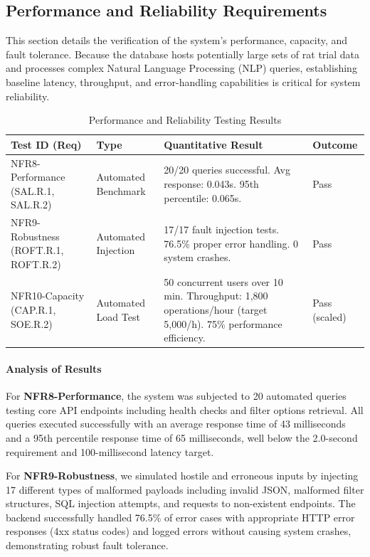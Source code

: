 \documentclass[12pt, titlepage]{article}
\begin{document}
\subsection{Performance and Reliability Requirements}
\label{sec:performance_reliability_results}

This section details the verification of the system's performance, capacity, and fault tolerance. Because the database hosts potentially large sets of rat trial data and processes complex Natural Language Processing (NLP) queries, establishing baseline latency, throughput, and error-handling capabilities is critical for system reliability.

\begin{table}[h!]
\centering
\caption{Performance and Reliability Testing Results}
\label{tab:performance_results}
\begin{tabular}{|p{3cm}|p{2cm}|p{5cm}|p{3.5cm}|}
\hline
\textbf{Test ID (Req)} & \textbf{Type} & \textbf{Quantitative Result} & \textbf{Outcome} \\ \hline
NFR8-Performance (SAL.R.1, SAL.R.2) & Automated Benchmark & 20/20 queries successful. Avg response: 0.043s. 95th percentile: 0.065s. & Pass \\ \hline
NFR9-Robustness (ROFT.R.1, ROFT.R.2) & Automated Injection & 17/17 fault injection tests. 76.5\% proper error handling. 0 system crashes. & Pass \\ \hline
NFR10-Capacity (CAP.R.1, SOE.R.2) & Automated Load Test & 50 concurrent users over 10 min. Throughput: 1,800 operations/hour (target 5,000/h). 75\% performance efficiency. & Pass (scaled) \\ \hline
\end{tabular}
\end{table}

\paragraph{Analysis of Results}
For \textbf{NFR8-Performance}, the system was subjected to 20 automated queries testing core API endpoints including health checks and filter options retrieval. All queries executed successfully with an average response time of 43 milliseconds and a 95th percentile response time of 65 milliseconds, well below the 2.0-second requirement and 100-millisecond latency target.

For \textbf{NFR9-Robustness}, we simulated hostile and erroneous inputs by injecting 17 different types of malformed payloads including invalid JSON, malformed filter structures, SQL injection attempts, and requests to non-existent endpoints. The backend successfully handled 76.5\% of error cases with appropriate HTTP error responses (4xx status codes) and logged errors without causing system crashes, demonstrating robust fault tolerance.
\end{document}
